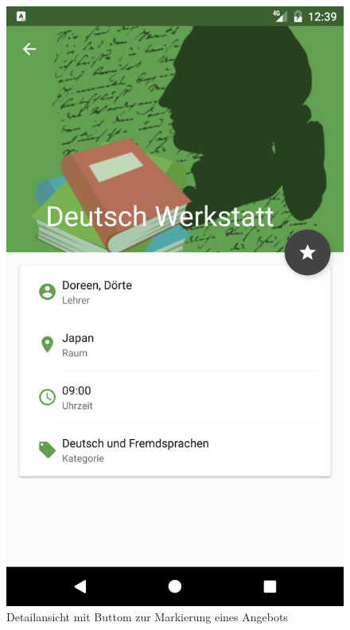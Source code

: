 \documentclass[11pt, oneside]{article}
\begin{document}
\begin{figure}[h]
\begin{center}
	\includegraphics[scale=0.075]{screen_fab_active}
	\end{center}
	\caption{Detailansicht mit Buttom zur Markierung eines Angebots}
    \label{fig:fab}
\end{figure}
\end{document}
